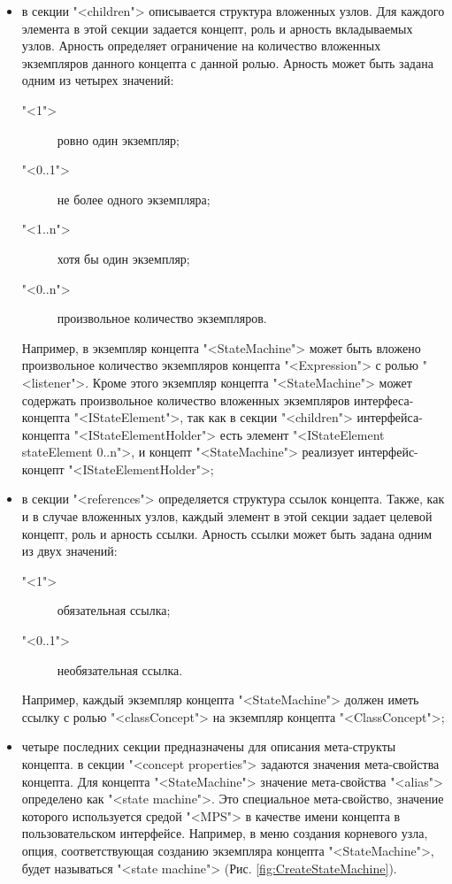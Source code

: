 \begin{itemize}
 \item в секции "<children"> описывается структура вложенных узлов. Для каждого элемента в этой секции задается концепт, роль и арность вкладываемых узлов. Арность определяет ограничение на количество вложенных экземпляров данного концепта с данной ролью. Арность может быть задана одним из четырех значений:
\begin{description}
 \item["<1">] ровно один экземпляр;
 \item["<0..1">] не более одного экземпляра;
 \item["<1..n">] хотя бы один экземпляр;
 \item["<0..n">] произвольное количество экземпляров.
\end{description}
Например, в экземпляр концепта "<StateMachine"> может быть вложено произвольное количество экземпляров концепта "<Expression"> с ролью "<listener">. Кроме этого экземпляр концепта "<StateMachine"> может содержать произвольное количество вложенных экземпляров интерфеса-концепта "<IStateElement">, так как в секции "<children"> интерфейса-концепта "<IStateElementHolder"> есть элемент "<IStateElement stateElement 0..n">, и концепт "<StateMachine"> реализует интерфейс-концепт "<IStateElementHolder">;

\item в секции "<references"> определяется структура ссылок концепта. Также, как и в случае вложенных узлов, каждый элемент в этой секции задает целевой концепт, роль и арность ссылки. Арность ссылки может быть задана одним из двух значений:
\begin{description}
 \item["<1">] обязательная ссылка;
 \item["<0..1">] необязательная ссылка.
\end{description}
Например, каждый экземпляр концепта "<StateMachine"> должен иметь ссылку с ролью "<classConcept"> на экземпляр концепта "<ClassConcept">;

\item четыре последних секции предназначены для описания мета-структы концепта. в секции "<concept properties"> задаются значения мета-свойства концепта. Для концепта "<StateMachine"> значение мета-свойства "<alias"> определено как "<state machine">. Это специальное мета-свойство, значение которого используется средой "<MPS"> в качестве имени концепта в пользовательском интерфейсе. Например, в меню создания корневого узла, опция, соответствующая созданию экземпляра концепта "<StateMachine">, будет называться "<state machine"> (Рис. \ref{fig:CreateStateMachine}).


\end{itemize}
